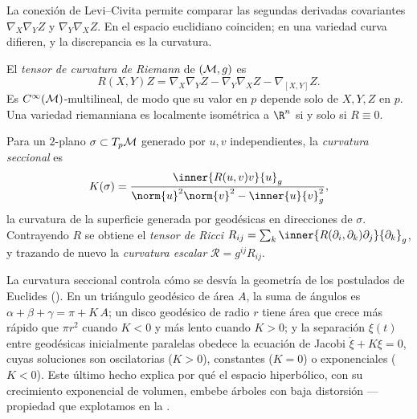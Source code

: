 La conexi\'on de Levi--Civita permite comparar las segundas derivadas
covariantes $\nabla_X \nabla_Y Z$ y $\nabla_Y \nabla_X Z$. En el espacio
euclidiano coinciden; en una variedad curva difieren, y la discrepancia es la
curvatura.

\begin{definition}
\label{def:geo:riemann}
El \emph{tensor de curvatura de Riemann} de $(\mathcal{M}, g)$ es
\[
  R(X,Y)Z = \nabla_X \nabla_Y Z - \nabla_Y \nabla_X Z - \nabla_{[X,Y]} Z .
\]
Es $C^\infty(\mathcal{M})$-multilineal, de modo que su valor en $p$ depende solo de
$X, Y, Z$ en $p$. Una variedad riemanniana es localmente isom\'etrica a $\R^n$
si y solo si $R \equiv 0$.
\end{definition}

\begin{definition}
\label{def:geo:sectional}
Para un $2$-plano $\sigma \subset T_p\mathcal{M}$ generado por $u, v$ independientes, la
\emph{curvatura seccional} es
\[
  K(\sigma) = \frac{\inner{R(u,v)v}{u}_g}{\norm{u}^2\norm{v}^2 - \inner{u}{v}_g^2},
\]
la curvatura de la superficie generada por geod\'esicas en direcciones de
$\sigma$. Contrayendo $R$ se obtiene el \emph{tensor de Ricci}
$R_{ij} = \sum_k \inner{R(\partial_i,\partial_k)\partial_j}{\partial_k}_g$, y
trazando de nuevo la \emph{curvatura escalar} $\mathcal{R} = g^{ij}R_{ij}$.
\end{definition}

La curvatura seccional controla c\'omo se desv\'ia la geometr\'ia de los
postulados de Euclides (). En un tri\'angulo geod\'esico
de \'area $A$, la suma de \'angulos es $\alpha + \beta + \gamma = \pi + K\,A$; un
disco geod\'esico de radio $r$ tiene \'area que crece m\'as r\'apido que
$\pi r^2$ cuando $K < 0$ y m\'as lento cuando $K > 0$; y la separaci\'on
$\xi(t)$ entre geod\'esicas inicialmente paralelas obedece la ecuaci\'on de
Jacobi $\ddot\xi + K\xi = 0$, cuyas soluciones son oscilatorias ($K > 0$),
constantes ($K = 0$) o exponenciales ($K < 0$). Este \'ultimo hecho explica por
qu\'e el espacio hiperb\'olico, con su crecimiento exponencial de volumen,
embebe \'arboles con baja distorsi\'on --- propiedad que explotamos en la
.

